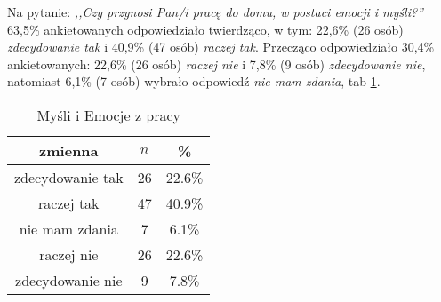 Na pytanie: \textit{,,Czy przynosi Pan/i pracę do domu, w postaci emocji i myśli?''} 63,5\% ankietowanych odpowiedziało twierdząco, w tym: 22,6\% (26 osób) \textit{zdecydowanie tak} i 40,9\% (47 osób) \textit{raczej tak}. Przecząco odpowiedziało 30,4\% ankietowanych: 22,6\% (26 osób) \textit{raczej nie} i 7,8\% (9 osób) \textit{zdecydowanie nie}, natomiast 6,1\% (7 osób) wybrało odpowiedź \textit{nie mam zdania}, tab \ref{tab:Q10}.


\begin{table}[H]
\caption{Myśli i Emocje z pracy}
\centering
\begin{tabular}{ | c | c | c |}
\hline
zmienna & $n$ & \% \\
\hline
zdecydowanie tak  &  26  & 22.6\% \\
\hline
raczej tak  &  47  & 40.9\% \\
\hline
nie mam zdania  &  7  & 6.1\% \\
\hline
raczej nie  &  26  & 22.6\% \\
\hline
zdecydowanie nie  &  9  & 7.8\% \\
\hline
\end{tabular}
\label{tab:Q10}
\end{table}

